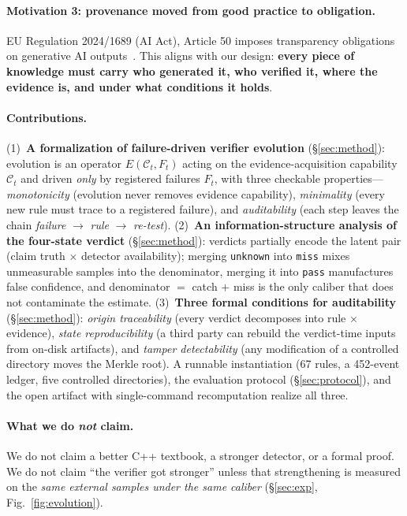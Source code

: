 \documentclass{article}
\begin{document}
\paragraph{Motivation 3: provenance moved from good practice to obligation.}
EU Regulation 2024/1689 (AI Act), Article 50 imposes transparency obligations on generative AI
outputs~\cite{eu2024aiact}. This aligns with our design: \textbf{every piece of knowledge must
carry who generated it, who verified it, where the evidence is, and under what conditions it
holds}.

\paragraph{Contributions.}
(1)~\textbf{A formalization of failure-driven verifier evolution} (\S\ref{sec:method}): evolution
is an operator $E(\mathcal{C}_t, F_t)$ acting on the evidence-acquisition capability
$\mathcal{C}_t$ and driven \emph{only} by registered failures $F_t$, with three checkable
properties---\emph{monotonicity} (evolution never removes evidence capability), \emph{minimality}
(every new rule must trace to a registered failure), and \emph{auditability} (each step leaves the
chain \emph{failure} $\to$ \emph{rule} $\to$ \emph{re-test}).
(2)~\textbf{An information-structure analysis of the four-state verdict} (\S\ref{sec:method}):
verdicts partially encode the latent pair (claim truth $\times$ detector availability); merging
\texttt{unknown} into \texttt{miss} mixes unmeasurable samples into the denominator, merging it
into \texttt{pass} manufactures false confidence, and denominator $=$ catch $+$ miss is the only
caliber that does not contaminate the estimate.
(3)~\textbf{Three formal conditions for auditability} (\S\ref{sec:method}): \emph{origin
traceability} (every verdict decomposes into rule $\times$ evidence), \emph{state
reproducibility} (a third party can rebuild the verdict-time inputs from on-disk artifacts), and
\emph{tamper detectability} (any modification of a controlled directory moves the Merkle root).
A runnable instantiation (67 rules, a 452-event ledger, five controlled directories), the
evaluation protocol (\S\ref{sec:protocol}), and the open artifact with single-command
recomputation realize all three.

\paragraph{What we do \emph{not} claim.}
We do not claim a better C++ textbook, a stronger detector, or a formal proof. We do not claim
``the verifier got stronger'' unless that strengthening is measured on the \emph{same external
samples under the same caliber} (\S\ref{sec:exp}, Fig.~\ref{fig:evolution}).
\end{document}

